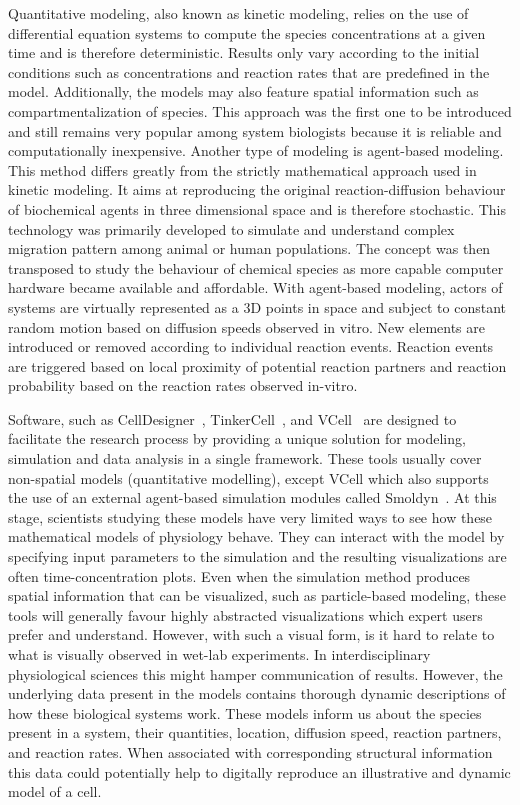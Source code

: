 Quantitative modeling, also known as kinetic modeling, relies on the use of differential equation systems to compute the species concentrations at a given time and is therefore deterministic.
Results only vary according to the initial conditions such as concentrations and reaction rates that are predefined in the model.
Additionally, the models may also feature spatial information such as compartmentalization of species.
This approach was the first one to be introduced and still remains very popular among system biologists because it is reliable and computationally inexpensive.
Another type of modeling is agent-based modeling.
This method differs greatly from the strictly mathematical approach used in kinetic modeling.
It aims at reproducing the original reaction-diffusion behaviour of biochemical agents in three dimensional space and is therefore stochastic.
This technology was primarily developed to simulate and understand complex migration pattern among animal or human populations.
The concept was then transposed to study the behaviour of chemical species as more capable computer hardware became available and affordable.
With agent-based modeling, actors of systems are virtually represented as a 3D points in space and subject to constant random motion based on diffusion speeds observed in vitro.
New elements are introduced or removed according to individual reaction events.
Reaction events are triggered based on local proximity of potential reaction partners and reaction probability based on the reaction rates observed in-vitro.

Software, such as CellDesigner~\cite{funahashi2003celldesigner}, TinkerCell~\cite{chandran2009tinkercell}, and VCell~\cite{moraru2008virtual} are designed to facilitate the research process by providing a unique solution for modeling, simulation and data analysis in a single framework.
These tools usually cover non-spatial models (quantitative modelling), except VCell which also supports the use of an external agent-based simulation modules called Smoldyn~\cite{andrews2010detailed}.
At this stage, scientists studying these models have very limited ways to see how these mathematical models of physiology behave.
They can interact with the model by specifying input parameters to the simulation and the resulting visualizations are often time-concentration plots.
Even when the simulation method produces spatial information that can be visualized, such as particle-based modeling, these tools will generally favour highly abstracted visualizations which expert users prefer and understand.
However, with such a visual form, is it hard to relate to what is visually observed in wet-lab experiments. 
In interdisciplinary physiological sciences this might hamper communication of results. 
However, the underlying data present in the models contains thorough dynamic descriptions of how these biological systems work.
These models inform us about the species present in a system, their quantities, location, diffusion speed, reaction partners, and reaction rates.
When associated with corresponding structural information this data could potentially help to digitally reproduce an illustrative and dynamic model of a cell.

